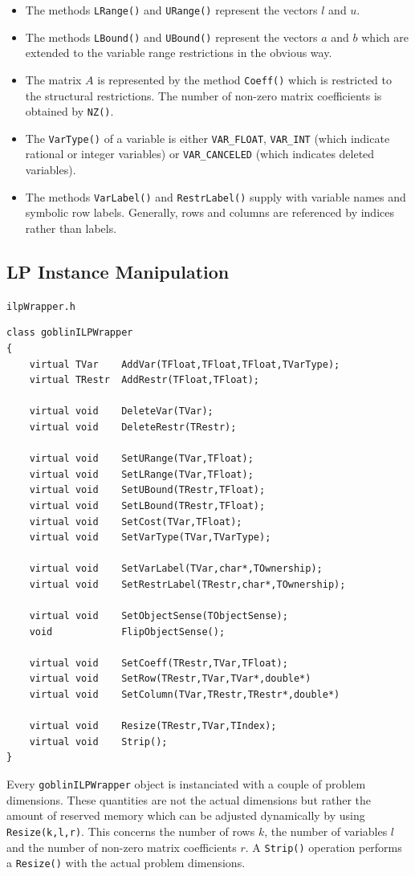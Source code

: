 \documentclass[a4paper,11pt,twoside]{book}
\begin{document}
\begin{multicols}{2}
\begin{itemize}
\item The methods \verb/LRange()/ and \verb/URange()/ represent the vectors
    $l$ and $u$.
\item The methods \verb/LBound()/ and \verb/UBound()/ represent the vectors
    $a$ and $b$ which are extended to the variable range restrictions in the
    obvious way.
\item The matrix $A$ is represented by the method \verb/Coeff()/ which is
    restricted to the structural restrictions. The number of non-zero matrix
    coefficients is obtained by \verb/NZ()/.
\item The \verb/VarType()/ of a variable is either \verb/VAR_FLOAT/,
    \verb/VAR_INT/ (which indicate rational or integer variables) or
    \verb/VAR_CANCELED/ (which indicates deleted variables).
\item The methods \verb/VarLabel()/ and \verb/RestrLabel()/ supply with
    variable names and symbolic row labels. Generally, rows and columns
    are referenced by indices rather than labels.
\end{itemize}


\newpage
\subsection{LP Instance Manipulation}
\myinclude\verb/ilpWrapper.h/
\begin{mymethods}
\begin{verbatim}
class goblinILPWrapper
{
    virtual TVar    AddVar(TFloat,TFloat,TFloat,TVarType);
    virtual TRestr  AddRestr(TFloat,TFloat);

    virtual void    DeleteVar(TVar);
    virtual void    DeleteRestr(TRestr);

    virtual void    SetURange(TVar,TFloat);
    virtual void    SetLRange(TVar,TFloat);
    virtual void    SetUBound(TRestr,TFloat);
    virtual void    SetLBound(TRestr,TFloat);
    virtual void    SetCost(TVar,TFloat);
    virtual void    SetVarType(TVar,TVarType);

    virtual void    SetVarLabel(TVar,char*,TOwnership);
    virtual void    SetRestrLabel(TRestr,char*,TOwnership);

    virtual void    SetObjectSense(TObjectSense);
    void            FlipObjectSense();

    virtual void    SetCoeff(TRestr,TVar,TFloat);
    virtual void    SetRow(TRestr,TVar,TVar*,double*)
    virtual void    SetColumn(TVar,TRestr,TRestr*,double*)

    virtual void    Resize(TRestr,TVar,TIndex);
    virtual void    Strip();
}
\end{verbatim}
\end{mymethods}
Every \verb/goblinILPWrapper/ object is instanciated with a couple of problem
dimensions. These quantities are not the actual dimensions but rather the
amount of reserved memory which can be adjusted dynamically by using
\verb/Resize(k,l,r)/. This concerns the number of rows $k$, the number of
variables $l$ and the number of non-zero matrix coefficients $r$. A
\verb/Strip()/ operation performs a \verb/Resize()/ with the actual problem
dimensions.


\end{multicols}
\end{document}
